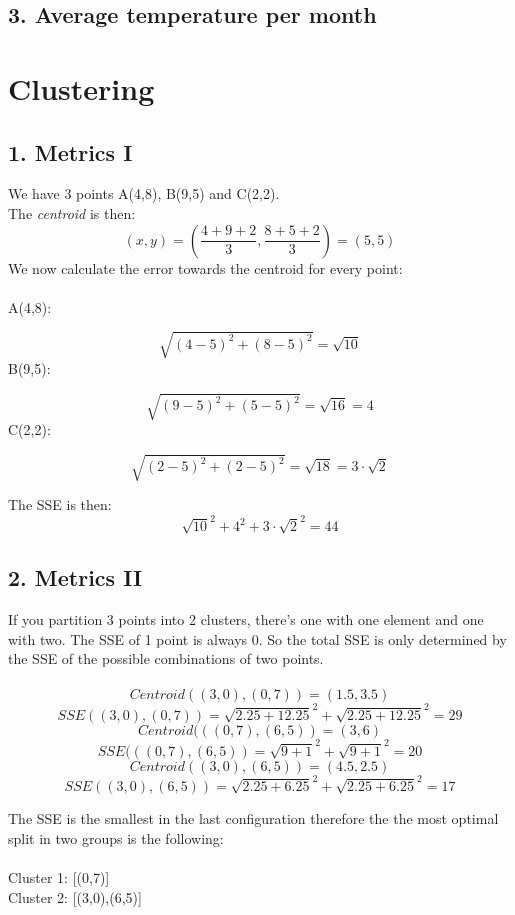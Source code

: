 \documentclass[11pt,a4paper]{article}
\begin{document}
\subsection*{3. Average temperature per month}


\pagebreak
\section*{Clustering}
\subsection*{1. Metrics I}
We have 3 points A(4,8), B(9,5) and C(2,2).\\
The \textit{centroid} is then:
$$ (x,y) = \left(\frac{4+9+2}{3},\frac{8+5+2}{3}\right)= (5,5)$$
We now calculate the error towards the centroid for every point:\\
\\
A(4,8):

$$\sqrt{(4-5)^2 + (8-5)^2} = \sqrt{10}$$
\noindent
B(9,5):

$$\sqrt{(9-5)^2 + (5-5)^2} = \sqrt{16} = 4$$
\noindent
C(2,2):

$$\sqrt{(2-5)^2 + (2-5)^2} = \sqrt{18} = 3\cdot\sqrt{2}$$

\noindent
The SSE is then:
$$\sqrt{10}^2 + 4^2 + 3\cdot\sqrt{2}^2 = 44$$

\subsection*{2. Metrics II}
If you partition 3 points into 2 clusters, there's one with one element and one with two.
The SSE of 1 point is always 0. So the total SSE is only determined by the SSE of the possible combinations of two points.
\\
\\
$$Centroid((3,0),(0,7))=(1.5,3.5)$$
$$SSE((3,0),(0,7))=\sqrt{2.25+12.25}^2 + \sqrt{2.25+12.25}^2 = 29$$
$$Centroid(((0,7),(6,5))=(3,6)$$
$$SSE(((0,7),(6,5))=\sqrt{9+1}^2 + \sqrt{9+1}^2 = 20$$
$$Centroid((3,0),(6,5))=(4.5,2.5)$$
$$SSE((3,0),(6,5))=\sqrt{2.25+6.25}^2 + \sqrt{2.25+6.25}^2 = 17$$

The SSE is the smallest in the last configuration therefore the the most optimal split in two groups is the following:
\\
\\
Cluster 1: [(0,7)]\\
Cluster 2: [(3,0),(6,5)]
\end{document}
